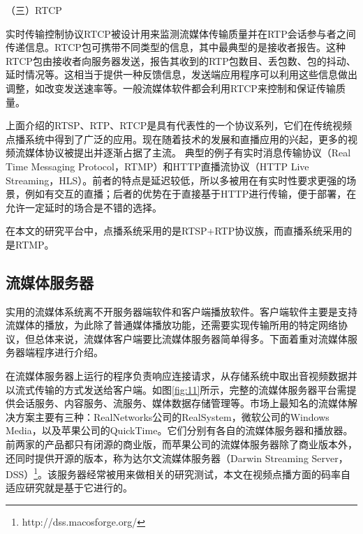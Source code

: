 （三）RTCP

实时传输控制协议RTCP被设计用来监测流媒体传输质量并在RTP会话参与者之间传递信息。RTCP包可携带不同类型的信息，其中最典型的是接收者报告。这种RTCP包由接收者向服务器发送，报告其收到的RTP包数目、丢包数、包的抖动、延时情况等。这相当于提供一种反馈信息，发送端应用程序可以利用这些信息做出调整，如改变发送速率等。一般流媒体软件都会利用RTCP来控制和保证传输质量。

上面介绍的RTSP、RTP、RTCP是具有代表性的一个协议系列，它们在传统视频点播系统中得到了广泛的应用。现在随着技术的发展和直播应用的兴起，更多的视频流媒体协议被提出并逐渐占据了主流。
典型的例子有实时消息传输协议（Real Time Messaging Protocol，RTMP）\supercite{RTMP}和HTTP直播流协议（HTTP Live Streaming，HLS）\supercite{HLS}。前者的特点是延迟较低，所以多被用在有实时性要求更强的场景，例如有交互的直播；后者的优势在于直接基于HTTP进行传输，便于部署，在允许一定延时的场合是不错的选择。

在本文的研究平台中，点播系统采用的是RTSP+RTP协议族，而直播系统采用的是RTMP。

\subsection{流媒体服务器}

实用的流媒体系统离不开服务器端软件和客户端播放软件。客户端软件主要是支持流媒体的播放，为此除了普通媒体播放功能，还需要实现传输所用的特定网络协议，但总体来说，流媒体客户端要比流媒体服务器简单得多。下面着重对流媒体服务器端程序进行介绍。

在流媒体服务器上运行的程序负责响应连接请求，从存储系统中取出音视频数据并以流式传输的方式发送给客户端。如图\ref{fig:11}所示，完整的流媒体服务器平台需提供会话服务、内容服务、流服务、媒体数据存储管理等。市场上最知名的流媒体解决方案主要有三种：RealNetworks公司的RealSystem，微软公司的Windows Media，以及苹果公司的QuickTime。它们分别有各自的流媒体服务器和播放器。前两家的产品都只有闭源的商业版，而苹果公司的流媒体服务器除了商业版本外，还同时提供开源的版本，称为达尔文流媒体服务器（Darwin Streaming Server，DSS）\footnote{http://dss.macosforge.org/}。该服务器经常被用来做相关的研究测试\supercite{Huang2004}，本文在视频点播方面的码率自适应研究就是基于它进行的。

